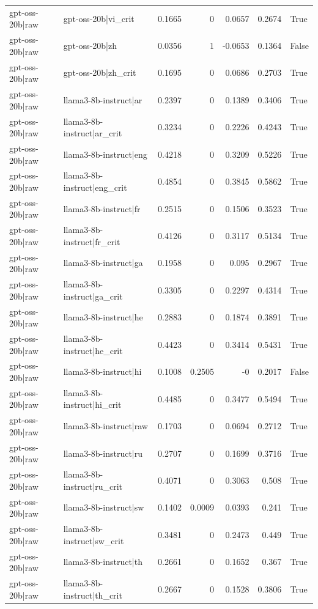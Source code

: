 \begin{table}
\begin{tabular}{l l r r r r l}
gpt-oss-20b|raw & gpt-oss-20b|vi_crit & 0.1665 & 0 & 0.0657 & 0.2674 & True \\
gpt-oss-20b|raw & gpt-oss-20b|zh & 0.0356 & 1 & -0.0653 & 0.1364 & False \\
gpt-oss-20b|raw & gpt-oss-20b|zh_crit & 0.1695 & 0 & 0.0686 & 0.2703 & True \\
gpt-oss-20b|raw & llama3-8b-instruct|ar & 0.2397 & 0 & 0.1389 & 0.3406 & True \\
gpt-oss-20b|raw & llama3-8b-instruct|ar_crit & 0.3234 & 0 & 0.2226 & 0.4243 & True \\
gpt-oss-20b|raw & llama3-8b-instruct|eng & 0.4218 & 0 & 0.3209 & 0.5226 & True \\
gpt-oss-20b|raw & llama3-8b-instruct|eng_crit & 0.4854 & 0 & 0.3845 & 0.5862 & True \\
gpt-oss-20b|raw & llama3-8b-instruct|fr & 0.2515 & 0 & 0.1506 & 0.3523 & True \\
gpt-oss-20b|raw & llama3-8b-instruct|fr_crit & 0.4126 & 0 & 0.3117 & 0.5134 & True \\
gpt-oss-20b|raw & llama3-8b-instruct|ga & 0.1958 & 0 & 0.095 & 0.2967 & True \\
gpt-oss-20b|raw & llama3-8b-instruct|ga_crit & 0.3305 & 0 & 0.2297 & 0.4314 & True \\
gpt-oss-20b|raw & llama3-8b-instruct|he & 0.2883 & 0 & 0.1874 & 0.3891 & True \\
gpt-oss-20b|raw & llama3-8b-instruct|he_crit & 0.4423 & 0 & 0.3414 & 0.5431 & True \\
gpt-oss-20b|raw & llama3-8b-instruct|hi & 0.1008 & 0.2505 & -0 & 0.2017 & False \\
gpt-oss-20b|raw & llama3-8b-instruct|hi_crit & 0.4485 & 0 & 0.3477 & 0.5494 & True \\
gpt-oss-20b|raw & llama3-8b-instruct|raw & 0.1703 & 0 & 0.0694 & 0.2712 & True \\
gpt-oss-20b|raw & llama3-8b-instruct|ru & 0.2707 & 0 & 0.1699 & 0.3716 & True \\
gpt-oss-20b|raw & llama3-8b-instruct|ru_crit & 0.4071 & 0 & 0.3063 & 0.508 & True \\
gpt-oss-20b|raw & llama3-8b-instruct|sw & 0.1402 & 0.0009 & 0.0393 & 0.241 & True \\
gpt-oss-20b|raw & llama3-8b-instruct|sw_crit & 0.3481 & 0 & 0.2473 & 0.449 & True \\
gpt-oss-20b|raw & llama3-8b-instruct|th & 0.2661 & 0 & 0.1652 & 0.367 & True \\
gpt-oss-20b|raw & llama3-8b-instruct|th_crit & 0.2667 & 0 & 0.1528 & 0.3806 & True \\

\end{tabular}
\end{table}
